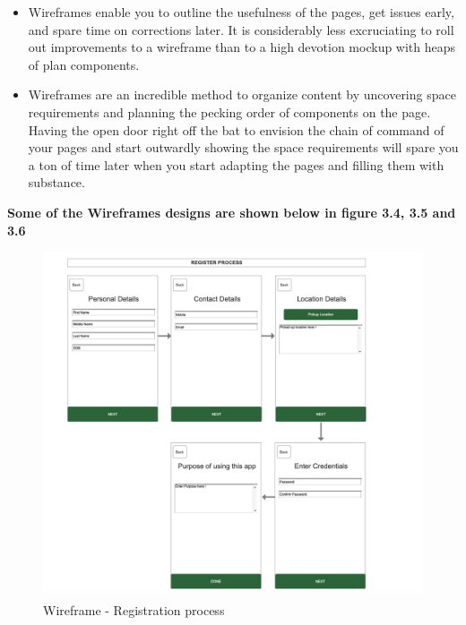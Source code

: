 \begin{itemize}
    \item Wireframes enable you to outline the usefulness of the pages, get issues early, and spare time on corrections later. It is considerably less excruciating to roll out improvements to a wireframe than to a high devotion mockup with heaps of plan components. \\
    
    \item Wireframes are an incredible method to organize content by uncovering space requirements and planning the pecking order of components on the page. Having the open door right off the bat to envision the chain of command of your pages and start outwardly showing the space requirements will spare you a ton of time later when you start adapting the pages and filling them with substance. \\
\end{itemize}

\centerline{\textbf{Some of the Wireframes designs are shown below in figure 3.4, 3.5 and 3.6}} 

    \begin{figure}[H]
            \centering
            \includegraphics[width=1.0\linewidth]{figures/ch3/wireframe_1.png}
            \caption{\label{fig:wireframe_1} Wireframe - Registration process}
    \end{figure}
    
